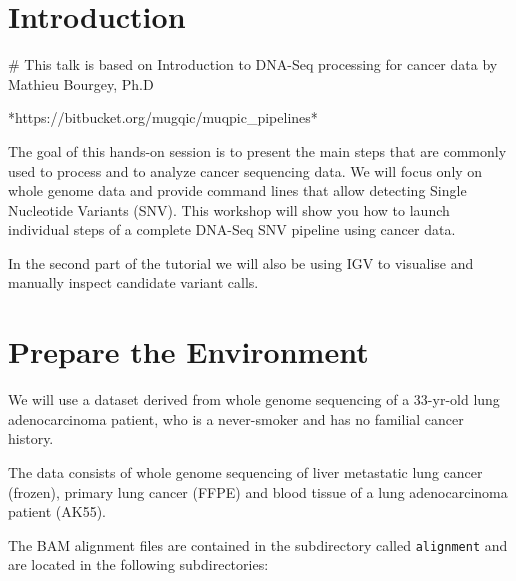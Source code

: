 \newpage


\section{Introduction}

# This talk is based on Introduction to DNA-Seq processing for cancer data by Mathieu Bourgey, Ph.D  

*https://bitbucket.org/mugqic/muqpic\_pipelines*

The goal of this hands-on session is to present the main steps that are commonly used to process and to analyze cancer sequencing data. We will focus only on whole genome data and provide command lines that allow detecting Single Nucleotide Variants (SNV). This workshop will show you how to launch individual steps of a complete DNA-Seq SNV pipeline using cancer data.

In the second part of the tutorial we will also be using IGV to visualise and manually inspect candidate variant calls.


\section{Prepare the Environment}

We will use a dataset derived from whole genome sequencing of a 33-yr-old lung adenocarcinoma patient, who is a never-smoker and has no familial cancer history.

The data consists of whole genome sequencing of liver metastatic lung cancer (frozen), primary lung cancer (FFPE) and blood tissue of a lung adenocarcinoma patient (AK55).

The BAM alignment files are contained in the subdirectory called \texttt{alignment} and are located in the following subdirectories:

\begin{description}[style=multiline,labelindent=1.5cm,align=left,leftmargin=2.5cm]
  \item[\texttt{normal/normal.sorted.bam} and \texttt{normal/normal.sorted.bam.bai}] \hfill\\
  \item[\texttt{tumor/tumor.sorted.bam} and \texttt{tumor/tumor.sorted.bam.bai}] \hfill\\ 
\end{description}

